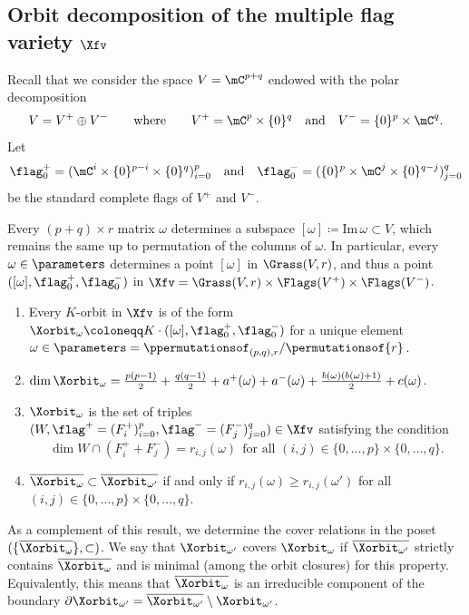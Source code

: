 \subsection{Orbit decomposition of the multiple flag variety $\Xfv$}

\label{section-2.2}

Recall that we consider the space $V=\mC^{p+q}$ endowed with the polar decomposition
\[V=V^+\oplus V^-\qquad\mbox{where}\qquad V^+=\mC^p\times\{0\}^q\quad\mbox{and}\quad V^-=\{0\}^p\times \mC^q.\]
Let
\[
\flag_0^+=(\mC^i\times\{0\}^{p-i}\times\{0\}^q)_{i=0}^p
\quad\mbox{and}\quad
\flag_0^-=(\{0\}^{p}\times\mC^j\times\{0\}^{q-j})_{j=0}^q
\]
be the standard complete flags of $V^+$ and $V^-$.

Every  $(p+q)\times r$ matrix $\omega$ determines a subspace $[\omega]\coloneqq \mathrm{Im}\,\omega\subset V$, which remains the same up to permutation of the columns of $\omega$.
In particular, every $\omega\in\parameters$ determines a point $[\omega]$ in $\Grass(V,r)$, and thus a point $([\omega],\flag_0^+,\flag_0^-)$ in $\Xfv=\Grass(V,r)\times\Flags(V^+)\times\Flags(V^-)$.

\begin{theorem}
\begin{enumerate}[label=(\arabic*)]
\item\label{Tp11} Every $K$-orbit in $\Xfv$ is of the form $\Xorbit_\omega\coloneqq K\cdot([\omega],\flag_0^+,\flag_0^-)$ for a unique element $\omega\in\parameters=\ppermutationsof_{(p,q),r}/\permutationsof{r}$.
\item \label{Tp12} $\dim\Xorbit_\omega=\frac{p(p-1)}{2}+\frac{q(q-1)}{2}+a^+(\omega)+a^-(\omega)+\frac{b(\omega)(b(\omega)+1)}{2}+c(\omega)$.
\item \label{Tp13} $\Xorbit_\omega$ is the set of triples $(W,\flag^+=(F^+_i)_{i=0}^p,\flag^-=(F_j^-)_{j=0}^q)\in\Xfv$
satisfying the condition
\[\dim W\cap(F_i^++F_j^-)=r_{i,j}(\omega)\ \ \mbox{for all $(i,j)\in\{0,\ldots,p\}\times\{0,\ldots,q\}$}.\]
 \item \label{Tp14} $\overline{\Xorbit_\omega}\subset\overline{\Xorbit_{\omega'}}$ if and only if $r_{i,j}(\omega)\geq r_{i,j}(\omega')$ for all $(i,j)\in\{0,\ldots,p\}\times\{0,\ldots,q\}$.
\end{enumerate}
\label{Tp1}
\end{theorem}

As a complement of this result, we determine the cover relations in the poset $(\{\overline{\Xorbit_\omega}\},\subset)$. We say that $\Xorbit_{\omega'}$ covers $\Xorbit_\omega$ if $\overline{\Xorbit_{\omega'}}$ strictly contains $\overline{\Xorbit_\omega}$ and is minimal (among the orbit closures) for this property.
Equivalently, this means that $\overline{\Xorbit_\omega}$ is an irreducible component of the boundary
$\partial\Xorbit_{\omega'}=\overline{\Xorbit_{\omega'}}\setminus \Xorbit_{\omega'}$.

